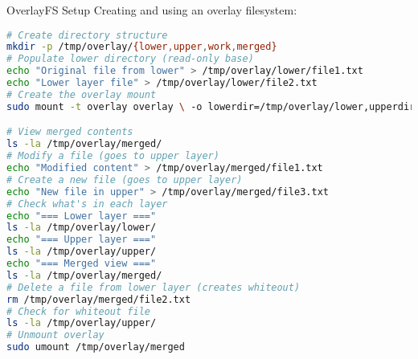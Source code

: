 \begin{example2}{OverlayFS Setup}
    Creating and using an overlay filesystem:
    
\begin{lstlisting}[language=bash, style=basesmol]
# Create directory structure
mkdir -p /tmp/overlay/{lower,upper,work,merged}
# Populate lower directory (read-only base)
echo "Original file from lower" > /tmp/overlay/lower/file1.txt
echo "Lower layer file" > /tmp/overlay/lower/file2.txt
# Create the overlay mount
sudo mount -t overlay overlay \ -o lowerdir=/tmp/overlay/lower,upperdir=/tmp/overlay/upper,workdir=/tmp/overlay/work \ /tmp/overlay/merged

# View merged contents
ls -la /tmp/overlay/merged/
# Modify a file (goes to upper layer)
echo "Modified content" > /tmp/overlay/merged/file1.txt
# Create a new file (goes to upper layer)
echo "New file in upper" > /tmp/overlay/merged/file3.txt
# Check what's in each layer
echo "=== Lower layer ==="
ls -la /tmp/overlay/lower/
echo "=== Upper layer ==="
ls -la /tmp/overlay/upper/
echo "=== Merged view ==="
ls -la /tmp/overlay/merged/
# Delete a file from lower layer (creates whiteout)
rm /tmp/overlay/merged/file2.txt
# Check for whiteout file
ls -la /tmp/overlay/upper/
# Unmount overlay
sudo umount /tmp/overlay/merged
\end{lstlisting}
\end{example2}

